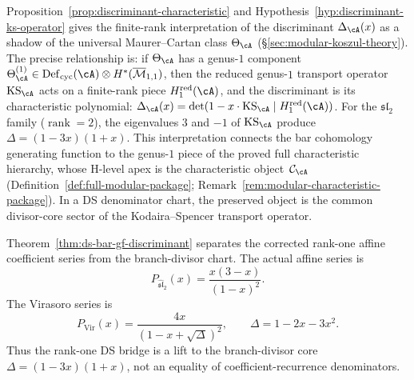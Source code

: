 \begin{remark}\label{rem:discriminant-universal-class}
Proposition~\ref{prop:discriminant-characteristic} and
Hypothesis~\ref{hyp:discriminant-ks-operator} gives the finite-rank
interpretation of the discriminant $\Delta_{\cA}(x)$ as a shadow of the universal
Maurer--Cartan class $\Theta_{\cA}$
(\S\ref{sec:modular-koszul-theory}). The precise relationship
is: if $\Theta_{\cA}$ has a genus-$1$ component
$\Theta_{\cA}^{(1)} \in \operatorname{Def}_{\mathrm{cyc}}(\cA)
\otimes H^*(\overline{\mathcal{M}}_{1,1})$, then the reduced
genus-$1$ transport operator $\operatorname{KS}_{\cA}$ acts on
a finite-rank piece $H^{\mathrm{red}}_1(\cA)$, and the
discriminant is its characteristic polynomial:
$\Delta_{\cA}(x) = \det(1 - x \cdot \operatorname{KS}_{\cA}
\mid H^{\mathrm{red}}_1(\cA))$. For the $\mathfrak{sl}_2$ family
($\operatorname{rank} = 2$), the eigenvalues $3$ and $-1$ of
$\operatorname{KS}_{\cA}$ produce
$\Delta = (1 - 3x)(1 + x)$. This interpretation connects the
bar cohomology generating function to the genus-$1$ piece of
the proved full characteristic hierarchy, whose H-level apex is
the characteristic object~$\mathcal{C}_{\cA}$
(Definition~\ref{def:full-modular-package};
Remark~\ref{rem:modular-characteristic-package}).  In a DS denominator
chart, the preserved object is the common divisor-core sector of the
Kodaira--Spencer transport operator.
\end{remark}

\begin{remark}\label{rem:ds-gf-transformation}
Theorem~\ref{thm:ds-bar-gf-discriminant} separates the corrected
rank-one affine coefficient series from the branch-divisor chart.  The
actual affine series is
\[
P_{\widehat{\mathfrak{sl}}_2}(x)=\frac{x(3-x)}{(1-x)^2}.
\]
The Virasoro series is
\[
P_{\mathrm{Vir}}(x) = \frac{4x}{(1 - x + \sqrt{\Delta})^2},
\qquad \Delta = 1 - 2x - 3x^2.
\]
Thus the rank-one DS bridge is a lift to the branch-divisor core
$\Delta=(1-3x)(1+x)$, not an equality of coefficient-recurrence
denominators.
\end{remark}

